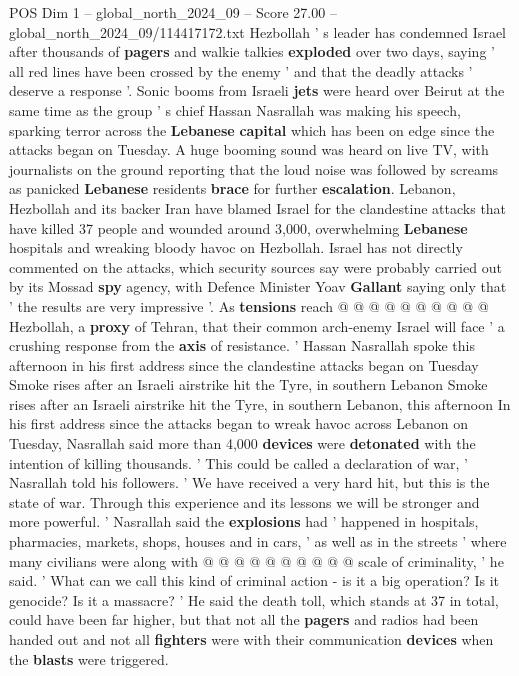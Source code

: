 \begin{textsample}{POS Dim 1 – global\_north\_2024\_09 – Score 27.00 – global\_north\_2024\_09/114417172.txt}  \label{ex:f1_pos_100}
Hezbollah ' s leader has condemned Israel after thousands of \textbf{pagers} and walkie talkies \textbf{exploded} over two days, saying ' all red lines have been crossed by the enemy ' and that the deadly attacks ' deserve a response '.
Sonic booms from Israeli \textbf{jets} were heard over Beirut at the same time as the group ' s chief Hassan Nasrallah was making his speech, sparking terror across the \textbf{Lebanese} \textbf{capital} which has been on edge since the attacks began on Tuesday.
A huge booming sound was heard on live TV, with journalists on the ground reporting that the loud noise was followed by screams as panicked \textbf{Lebanese} residents \textbf{brace} for further \textbf{escalation}.
Lebanon, Hezbollah and its backer Iran have blamed Israel for the clandestine attacks that have killed 37 people and wounded around 3,000, overwhelming \textbf{Lebanese} hospitals and wreaking bloody havoc on Hezbollah.
Israel has not directly commented on the attacks, which security sources say were probably carried out by its Mossad \textbf{spy} agency, with Defence Minister Yoav \textbf{Gallant} saying only that ' the results are very impressive '.
As \textbf{tensions} reach @ @ @ @ @ @ @ @ @ @ Hezbollah, a \textbf{proxy} of Tehran, that their common arch-enemy Israel will face ' a crushing response from the \textbf{axis} of resistance. ' Hassan Nasrallah spoke this afternoon in his first address since the clandestine attacks began on Tuesday Smoke rises after an Israeli airstrike hit the Tyre, in southern Lebanon Smoke rises after an Israeli airstrike hit the Tyre, in southern Lebanon, this afternoon In his first address since the attacks began to wreak havoc across Lebanon on Tuesday, Nasrallah said more than 4,000 \textbf{devices} were \textbf{detonated} with the intention of killing thousands. ' This could be called a declaration of war, ' Nasrallah told his followers. ' We have received a very hard hit, but this is the state of war.
Through this experience and its lessons we will be stronger and more powerful. ' Nasrallah said the \textbf{explosions} had ' happened in hospitals, pharmacies, markets, shops, houses and in cars, ' as well as in the streets ' where many civilians were along with @ @ @ @ @ @ @ @ @ @ scale of criminality, ' he said. ' What can we call this kind of criminal action - is it a big operation?
Is it genocide?
Is it a massacre? ' He said the death toll, which stands at 37 in total, could have been far higher, but that not all the \textbf{pagers} and radios had been handed out and not all \textbf{fighters} were with their communication \textbf{devices} when the \textbf{blasts} were triggered.

\end{textsample}
